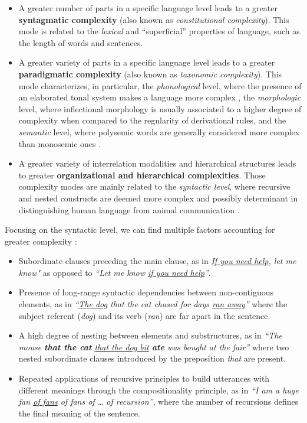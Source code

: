 \documentclass[a4paper, nobind]{templates/ociamthesis}
\begin{document}
\begin{itemize}
\item
  A greater number of parts in a specific language level leads to a greater \textbf{syntagmatic complexity} (also known as \emph{constitutional complexity}). This mode is related to the \emph{lexical} and ``superficial'' properties of language, such as the length of words and sentences.
\item
  A greater variety of parts in a specific language level leads to a greater \textbf{paradigmatic complexity} (also known as \emph{taxonomic complexity}). This mode characterizes, in particular, the \emph{phonological} level, where the presence of an elaborated tonal system makes a language more complex \autocite{mcwhorter-2001-world}, the \emph{morphologic} level, where inflectional morphology is usually associated to a higher degree of complexity \autocites{mcwhorter-2001-world}{kusters-2003-linguistic} when compared to the regularity of derivational rules, and the \emph{semantic} level, where polysemic words are generally considered more complex than monosemic ones \autocite{voghera-2001-riflessioni}.
\item
  A greater variety of interrelation modalities and hierarchical structures leads to greater \textbf{organizational and hierarchical complexities}. Those complexity modes are mainly related to the \emph{syntactic level}, where recursive and nested constructs are deemed more complex and possibly determinant in distinguishing human language from animal communication \autocite{hauser-2002-faculty}.
\end{itemize}

Focusing on the syntactic level, we can find multiple factors accounting for greater complexity \autocite{berruto-2011-linguistica}:

\begin{itemize}
\item
  Subordinate clauses preceding the main clause, as in \emph{\underline{If you need help}, let me know"} as opposed to \emph{``Let me know \underline{if you need help}''}.
\item
  Presence of long-range syntactic dependencies between non-contiguous elements, as in \emph{``\underline{The dog} that the cat chased for days \underline{ran away}''} where the subject referent (\emph{dog}) and its verb (\emph{ran}) are far apart in the sentence.
\item
  A high degree of nesting between elements and substructures, as in \emph{``The mouse \textbf{that the cat} \underline{that the dog bit} \textbf{ate} was bought at the fair''} where two nested subordinate clauses introduced by the preposition \emph{that} are present.
\item
  Repeated applications of recursive principles to build utterances with different meanings through the compositionality principle, as in \emph{``I am a huge fan \underline{of fans} of fans of \ldots{} of recursion''}, where the number of recursions defines the final meaning of the sentence.
\end{itemize}
\end{document}
